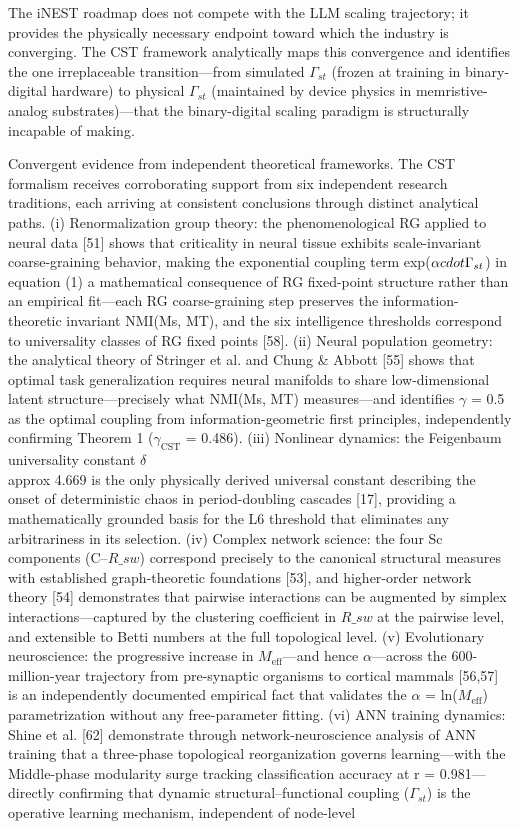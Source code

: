 \documentclass[a4paper,12pt]{article}
\begin{document}
The iNEST roadmap does not compete with the LLM scaling trajectory; it provides the physically necessary endpoint toward which the industry is converging. The CST framework analytically maps this convergence and identifies the one irreplaceable transition---from simulated $\Gamma_{st}$ (frozen at training in binary-digital hardware) to physical $\Gamma_{st}$ (maintained by device physics in memristive-analog substrates)---that the binary-digital scaling paradigm is structurally incapable of making.


Convergent evidence from independent theoretical frameworks. The CST formalism receives corroborating support from six independent research traditions, each arriving at consistent conclusions through distinct analytical paths. (i) Renormalization group theory: the phenomenological RG applied to neural data [51] shows that criticality in neural tissue exhibits scale-invariant coarse-graining behavior, making the exponential coupling term exp($\alpha \\cdot \Gamma_{st}$) in equation (1) a mathematical consequence of RG fixed-point structure rather than an empirical fit---each RG coarse-graining step preserves the information-theoretic invariant NMI(Ms, MT), and the six intelligence thresholds correspond to universality classes of RG fixed points [58]. (ii) Neural population geometry: the analytical theory of Stringer et al. and Chung \& Abbott [55] shows that optimal task generalization requires neural manifolds to share low-dimensional latent structure---precisely what NMI(Ms, MT) measures---and identifies $\gamma$ = 0.5 as the optimal coupling from information-geometric first principles, independently confirming Theorem 1 ($\gamma_{\text{CST}}$ = 0.486). (iii) Nonlinear dynamics: the Feigenbaum universality constant $\delta$  \\approx  4.669 is the only physically derived universal constant describing the onset of deterministic chaos in period-doubling cascades [17], providing a mathematically grounded basis for the L6 threshold that eliminates any arbitrariness in its selection. (iv) Complex network science: the four Sc components (C--$R\_{sw}$) correspond precisely to the canonical structural measures with established graph-theoretic foundations [53], and higher-order network theory [54] demonstrates that pairwise interactions can be augmented by simplex interactions---captured by the clustering coefficient in $R\_{sw}$ at the pairwise level, and extensible to Betti numbers at the full topological level. (v) Evolutionary neuroscience: the progressive increase in $M_{\text{eff}}$---and hence $\alpha$---across the 600-million-year trajectory from pre-synaptic organisms to cortical mammals [56,57] is an independently documented empirical fact that validates the $\alpha$ = ln($M_{\text{eff}}$) parametrization without any free-parameter fitting. (vi) ANN training dynamics: Shine et al. [62] demonstrate through network-neuroscience analysis of ANN training that a three-phase topological reorganization governs learning---with the Middle-phase modularity surge tracking classification accuracy at r = 0.981---directly confirming that dynamic structural--functional coupling ($\Gamma_{st}$) is the operative learning mechanism, independent of node-level 
\end{document}
